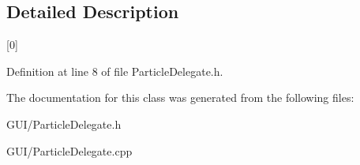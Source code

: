 \subsection{Detailed Description}
\mbox{[}0\mbox{]} 

Definition at line 8 of file Particle\+Delegate.\+h.



The documentation for this class was generated from the following files\+:\begin{DoxyCompactItemize}
\item 
G\+U\+I/Particle\+Delegate.\+h\item 
G\+U\+I/Particle\+Delegate.\+cpp\end{DoxyCompactItemize}
